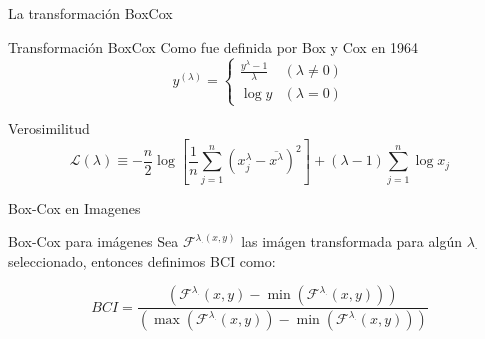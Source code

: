 \documentclass{beamer}
\begin{document}
\begin{frame}{La transformación BoxCox}
     
    \begin{block}{Transformación BoxCox}
    Como fue definida por Box y Cox en 1964 \cite{boxcox}
        \begin{equation}\label{boxcox}
            y^{(\lambda)}= \begin{cases}\frac{y^{\lambda}-1}{\lambda} & (\lambda \neq 0) \\ \log y & (\lambda=0)\end{cases}
        \end{equation}
    \end{block}
         
    \begin{block}{Verosimilitud}
        \begin{equation*}
            \mathcal{L}(\lambda) \equiv-\frac{n}{2} \log \left[\frac{1}{n} \sum_{j=1}^{n}\left(x_{j}^{\lambda}-\overline{x^{\lambda}}\right)^{2}\right] +(\lambda-1) \sum_{j=1}^{n} \log x_{j}
        \end{equation*}
    \end{block}
    
\end{frame}

\begin{frame}{Box-Cox en Imagenes}

    \begin{block}{Box-Cox para im\'agenes}
        Sea $\mathcal{F}^{\lambda_{\cdot}(x, y)}$ las im\'agen transformada para alg\'un $\lambda_\cdot$ seleccionado, entonces definimos BCI como:

    \begin{equation}
        BCI = \frac{\left(\mathcal{F}^{\lambda_{\cdot}}(x, y) - \min\left(\mathcal{F}^{\lambda_{\cdot}}(x, y)\right)\right)}{\left(\max\left(\mathcal{F}^{\lambda_{\cdot}}(x, y)\right) - \min\left(\mathcal{F}^{\lambda_{\cdot}}(x, y)\right)\right)}
    \end{equation}
        
        
    \end{block}
    
\end{frame}
\end{document}
